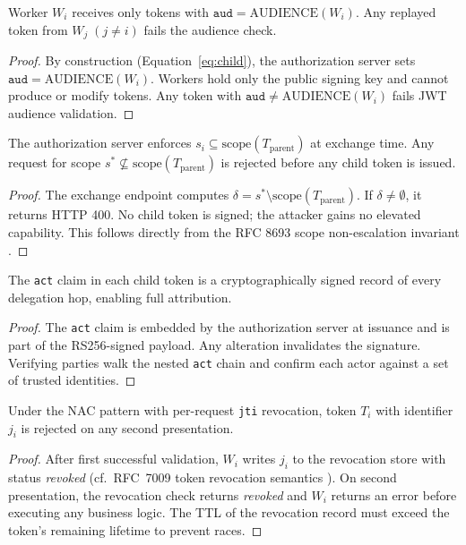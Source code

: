 \documentclass[journal]{IEEEtran}
\begin{document}
\begin{theorem}
Worker $W_i$ receives only tokens with $\texttt{aud}=\mathrm{AUDIENCE}(W_i)$.
Any replayed token from $W_j\;(j\neq i)$ fails the audience check.
\end{theorem}
\begin{proof}
By construction (Equation~\ref{eq:child}), the authorization server sets
$\texttt{aud}=\mathrm{AUDIENCE}(W_i)$. Workers hold only the public signing
key and cannot produce or modify tokens. Any token with
$\texttt{aud}\neq\mathrm{AUDIENCE}(W_i)$ fails JWT audience validation.
\end{proof}

\begin{theorem}
The authorization server enforces $s_i \subseteq \mathrm{scope}(T_{\mathrm{parent}})$
at exchange time. Any request for scope $s^* \not\subseteq
\mathrm{scope}(T_{\mathrm{parent}})$ is rejected before any child token is issued.
\end{theorem}
\begin{proof}
The exchange endpoint computes $\delta = s^* \setminus
\mathrm{scope}(T_{\mathrm{parent}})$. If $\delta\neq\emptyset$, it returns HTTP
400. No child token is signed; the attacker gains no elevated capability.
This follows directly from the RFC 8693 scope non-escalation invariant
\cite{rfc8693}.
\end{proof}

\begin{theorem}
The \texttt{act} claim in each child token is a cryptographically signed record
of every delegation hop, enabling full attribution.
\end{theorem}
\begin{proof}
The \texttt{act} claim is embedded by the authorization server at issuance and
is part of the RS256-signed payload. Any alteration invalidates the signature.
Verifying parties walk the nested \texttt{act} chain and confirm each actor
against a set of trusted identities.
\end{proof}

\begin{theorem}
Under the NAC pattern with per-request \texttt{jti} revocation, token $T_i$
with identifier $j_i$ is rejected on any second presentation.
\end{theorem}
\begin{proof}
After first successful validation, $W_i$ writes $j_i$ to the revocation store
with status \textit{revoked} (cf.\ RFC~7009 token revocation semantics \cite{rfc7009}). On second presentation, the revocation check
returns \textit{revoked} and $W_i$ returns an error before executing any
business logic. The TTL of the revocation record must exceed the token's
remaining lifetime to prevent races.
\end{proof}
\end{document}
